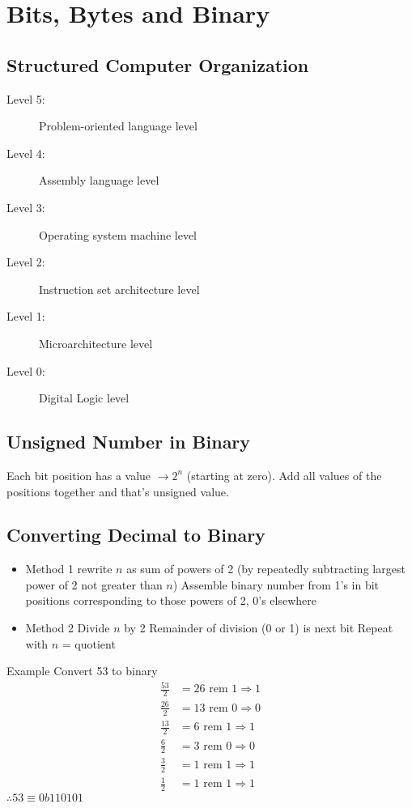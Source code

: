 \section{Bits, Bytes and Binary}
\subsection{Structured Computer Organization}
\begin{description}
	\item[Level 5:] Problem-oriented language level
	\item[Level 4:] Assembly language level
	\item[Level 3:] Operating system machine level
	\item[Level 2:] Instruction set architecture level
	\item[Level 1:] Microarchitecture level
	\item[Level 0:] Digital Logic level
\end{description}

\subsection{Unsigned Number in Binary}
Each bit position has a value $\rightarrow 2^n$ (starting at zero). Add all values of the positions together and that's unsigned value.

\subsection{Converting Decimal to Binary}
\begin{itemize}
	\item Method 1
	\subitem rewrite $n$ as sum of powers of 2 (by repeatedly subtracting largest power of 2 not greater than $n$)
	\subitem Assemble binary number from 1's in bit positions corresponding to those powers of 2, 0's elsewhere
	\item Method 2
	\subitem Divide $n$ by 2
	\subitem Remainder of division (0 or 1) is next bit
	\subitem Repeat with $n$ = quotient
\end{itemize}

\begin{note}{Example}
	Convert 53 to binary
	\begin{align*}
		\frac{53}{2} &= 26 \text{ rem } 1 \Rightarrow 1\\
		\frac{26}{2} &= 13 \text{ rem } 0 \Rightarrow 0\\
		\frac{13}{2} &= 6 \text{ rem } 1 \Rightarrow 1\\
		\frac{6}{2} &= 3 \text{ rem } 0 \Rightarrow 0\\
		\frac{3}{2} &= 1 \text{ rem } 1 \Rightarrow 1\\
		\frac{1}{2} &= 1 \text{ rem } 1 \Rightarrow 1
	\end{align*}
	$\therefore 53 \equiv 0b110101$
\end{note}


